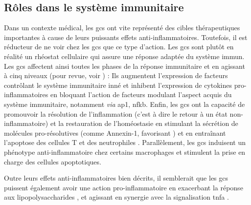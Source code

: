\documentclass[../main.tex]{subfiles}
\begin{document}

	\subsection{Rôles dans le système immunitaire}\label{subsec:gc-immune}
		Dans un contexte médical, les \glspl{gc} ont vite représenté des cibles thérapeutiques importantes à cause de leurs puissants effets anti-inflammatoires.
		Toutefois, il est réducteur de ne voir chez les \glspl{gc} que ce type d'action.
		Les \glspl{gc} sont plutôt en réalité un rhéostat cellulaire qui assure une réponse adaptée du système immun.
		Les \glspl{gc} affectent ainsi toutes les phases de la réponse immunitaire et en agissant à cinq niveaux (pour revue, voir \citealp{Busillo2013}) :
		Ils augmentent l'expression de facteurs contrôlant le système immunitaire inné et inhibent l'expression de cytokines pro-inflammatoires en bloquant l'action de facteurs modulant l'aspect acquis du système immunitaire, notamment \textit{via} \gls{ap1}, \gls{nfkb}.
		Enfin, les \glspl{gc} ont la capacité de promouvoir la résolution de l'inflammation (c'est à dire le retour à un état non-inflammatoire) et la restauration de l'homéostasie en stimulant la sécrétion de molécules pro-résolutives (comme Annexin-1, favorisant ) et en entraînant l'apoptose des cellules T et des neutrophiles \citep{Parrillo1979}.
		Parallèlement, les \glspl{gc} induisent un phénotype anti-inflammatoire chez certains macrophages et stimulent la prise en charge des cellules apoptotiques.
		\par
		Outre leurs effets anti-inflammatoires bien décrits, il semblerait que les \glspl{gc} puissent également avoir une action pro-inflammatoire en exacerbant la réponse aux lipopolysaccharides \citep{Munhoz2010,Frank2012}, et agissant en synergie avec la signalisation \gls{tnfa} \citep{Lannan2012}.

\end{document}

